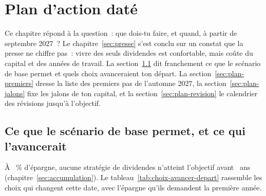 \section{Plan d'action dat\'e}\label{sec:plan}

Ce chapitre r\'epond \`a la question~: que dois-tu faire, et quand, \`a partir de septembre 2027~? Le
chapitre~\ref{sec:presse} s'est conclu sur un constat que la presse ne chiffre pas~: vivre des seuls
dividendes est confortable, mais co\^ute du capital et des ann\'ees de travail. La
section~\ref{sec:plan-verdict} dit franchement ce que le sc\'enario de base permet et quels choix
avanceraient ton d\'epart. La section~\ref{sec:plan-premiers} dresse la liste des premiers pas de
l'automne 2027, la section~\ref{sec:plan-jalons} fixe les jalons de ton capital, et la
section~\ref{sec:plan-revision} le calendrier des r\'evisions jusqu'\`a l'objectif.

\subsection{Ce que le sc\'enario de base permet, et ce qui l'avancerait}\label{sec:plan-verdict}

 \`A \SparquoteZwanzig~\%
d'\'epargne, aucune strat\'egie de dividendes n'atteint l'objectif avant \AlterHorizon~ans
(chapitre~\ref{sec:accumulation}). Le tableau~\ref{tab:choix-avancer-depart} rassemble les choix qui
changent cette date, avec l'\'epargne qu'ils demandent la premi\`ere ann\'ee.

